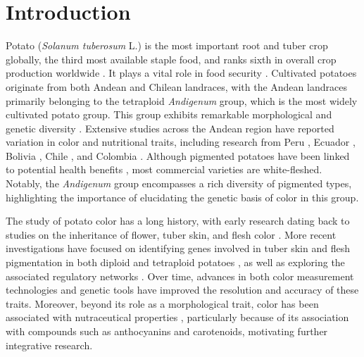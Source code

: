 \documentclass[pdflatex,sn-mathphys-ay]{sn-jnl}%
\begin{document}
\section{Introduction}\label{sec1}
Potato (\textit{Solanum tuberosum} L.) is the most important root and tuber crop globally, the third most available staple food, and ranks sixth in overall crop production worldwide \citep{FAO2024}. It plays a vital role in food security \citep{devaux2021potato}. Cultivated potatoes originate from both Andean and Chilean landraces, with the Andean landraces primarily belonging to the tetraploid \textit{Andigenum} group, which is the most widely cultivated potato group. This group exhibits remarkable morphological and genetic diversity \citep{spooner2005single}. Extensive studies across the Andean region have reported variation in color and nutritional traits, including research from Peru \citep{bellumori2020study}, Ecuador \citep{balladares2018evaluacion}, Bolivia \citep{larico2024descripcion}, Chile \citep{behn2023phenolic}, and Colombia \citep{Berdugo2017,berdugo2023phenotypic,garnica2012characterization}. Although pigmented potatoes have been linked to potential health benefits \citep{bvenura2022pigmented,lachman2005red}, most commercial varieties are white-fleshed. Notably, the \textit{Andigenum} group encompasses a rich diversity of pigmented types, highlighting the importance of elucidating the genetic basis of color in this group.

The study of potato color has a long history, with early research dating back to studies on the inheritance of flower, tuber skin, and flesh color \citep{salaman1911inheritance, lunden1932notes, black1933studies,  dodds1955inheritance,van1994inheritance}. More recent investigations have focused on identifying genes involved in tuber skin and flesh pigmentation in both diploid \citep{parra2019chromosomes} and tetraploid potatoes \citep{zhang2009genetic, pandey2022genomic,yusuf2024genomic}, as well as exploring the associated regulatory networks \citep{cho2016network,bonar2018potato}. Over time, advances in both color measurement technologies and genetic tools have improved the resolution and accuracy of these traits. Moreover, beyond its role as a morphological trait, color has been associated with nutraceutical properties \citep{dodds1955inheritance,parra2019chromosomes, li2024transcriptomic,cho2016network}, particularly because of its association with compounds such as anthocyanins and carotenoids, motivating further integrative research.  
\end{document}
